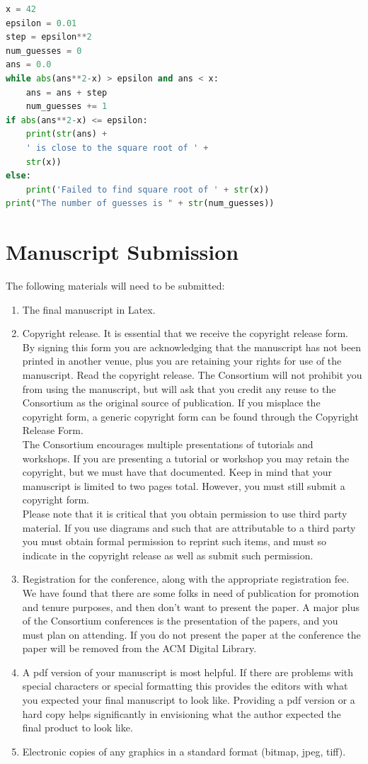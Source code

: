 \documentclass{article}
\begin{document}
\begin{lstlisting}[language=Python, basicstyle=\ttfamily\small, caption=Python example]
x = 42
epsilon = 0.01
step = epsilon**2
num_guesses = 0
ans = 0.0
while abs(ans**2-x) > epsilon and ans < x:
    ans = ans + step
    num_guesses += 1
if abs(ans**2-x) <= epsilon:
    print(str(ans) +
    ' is close to the square root of ' +
    str(x))
else:
    print('Failed to find square root of ' + str(x))
print("The number of guesses is " + str(num_guesses))
\end{lstlisting}

\section{Manuscript Submission}
The following materials will need to be submitted:
\begin{enumerate}[noitemsep]
  \item The final manuscript in Latex.
  \item Copyright release. It is essential that we receive the copyright
  release form. By signing this form you are acknowledging that the manuscript
  has not been printed in another venue, plus you are retaining your rights for
  use of the manuscript. Read the copyright release. The Consortium will not
  prohibit you from using the manuscript, but will ask that you credit any reuse
  to the Consortium as the original source of publication. If you misplace the
  copyright form, a generic copyright form can be found through the Copyright
  Release Form\cite{copyright}.\\
  The Consortium encourages multiple presentations of tutorials and workshops.
  If you are presenting a tutorial or workshop you may retain the copyright,
  but we must have that documented. Keep in mind that your manuscript is limited
  to two pages total. However, you must still submit a copyright form.\\
  Please note that it is critical that you obtain permission to use third party
  material. If you use diagrams and such that are attributable to a third party
  you must obtain formal permission to reprint such items, and must so indicate
  in the copyright release as well as submit such permission.
  \item Registration for the conference, along with the appropriate registration
  fee. We have found that there are some folks in need of publication for
  promotion and tenure purposes, and then don’t want to present the paper.
  A major plus of the Consortium conferences is the presentation of the papers,
  and you must plan on attending. If you do not present the paper at the
  conference the paper will be removed from the ACM Digital Library.
  \item A pdf version of your manuscript is most helpful. If there are problems
  with special characters or special formatting this provides the editors with
  what you expected your final manuscript to look like. Providing a pdf version
  or a hard copy helps significantly in envisioning what the author expected
  the final product to look like.
  \item Electronic copies of any graphics in a standard format (bitmap, jpeg, tiff).
\end{enumerate}
\end{document}
